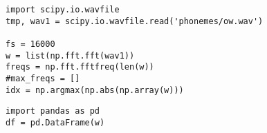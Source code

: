 \documentclass[12pt,fleqn]{article}\usepackage{../../common}
\begin{document}
\begin{verbatim}
import scipy.io.wavfile
tmp, wav1 = scipy.io.wavfile.read('phonemes/ow.wav')

fs = 16000
w = list(np.fft.fft(wav1))
freqs = np.fft.fftfreq(len(w))
#max_freqs = []
idx = np.argmax(np.abs(np.array(w)))
\end{verbatim}

\begin{verbatim}
import pandas as pd
df = pd.DataFrame(w)
\end{verbatim}
\end{document}
